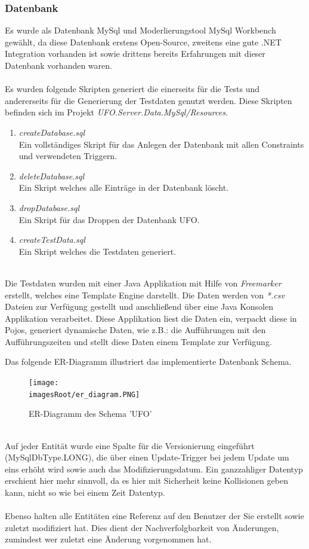 \documentclass[11pt, a4paper, twoside]{article}   	%
\newcommand{\imagesRoot}{images}
\begin{document}
\newpage
\subsubsection{Datenbank}
Es wurde als Datenbank MySql und Moderlierungstool MySql Workbench gewählt, da diese Datenbank erstens Open-Source, zweitens eine gute .NET Integration vorhanden ist sowie drittens bereits Erfahrungen mit dieser Datenbank vorhanden waren.\\\\
Es wurden folgende Skripten generiert die einerseits für die Tests und andererseits für die Generierung der Testdaten genutzt werden. Diese Skripten befinden sich im Projekt \emph{UFO.Server.Data.MySql/Resources}.\\
\begin{enumerate}
	\item\emph{createDatabase.sql}\\
	Ein vollständiges Skript für das Anlegen der Datenbank mit allen Constraints und verwendeten Triggern.
	\item\emph{deleteDatabase.sql}\\
	Ein Skript welches alle Einträge in der Datenbank löscht.
	\item\emph{dropDatabase.sql}\\
	Ein Skript für das Droppen der Datenbank UFO.
	\item\emph{createTestData.sql}\\
	Ein Skript welches die Testdaten generiert.
\end{enumerate}
\ \\
Die Testdaten wurden mit einer Java Applikation mit Hilfe von \emph{Freemarker} erstellt, welches eine Template Engine darstellt. Die Daten werden von \emph{*.csv} Dateien zur Verfügung gestellt und anschließend über eine Java Konsolen Applikation verarbeitet. Diese Applikation liest die Daten ein, verpackt diese in Pojos, generiert dynamische Daten, wie z.B.: die Aufführungen mit den Aufführungszeiten und stellt diese Daten einem Template zur Verfügung.

\newpage
Das folgende ER-Diagramm illustriert das implementierte Datenbank Schema.
\begin{figure}[h]
	\centering
	\texttt{[image: \\imagesRoot/er\_diagram.PNG]}
	\caption
	{ER-Diagramm des Schema 'UFO'}
\end{figure}
\ \\
Auf jeder Entität wurde eine Spalte für die Versionierung eingeführt (MySqlDbType.LONG), die über einen Update-Trigger bei jedem Update um eins erhöht wird sowie auch das Modifizierungsdatum. Ein ganzzahliger Datentyp erschient hier mehr sinnvoll, da es hier mit Sicherheit keine Kollisionen geben kann, nicht so wie bei einem Zeit Datentyp.\\\\
Ebenso halten alle Entitäten eine Referenz auf den Benutzer der Sie erstellt sowie zuletzt modifiziert hat. Dies dient der Nachverfolgbarkeit von Änderungen, zumindest wer zuletzt eine Änderung vorgenommen hat.
\end{document}
